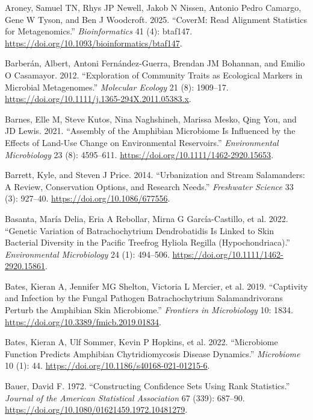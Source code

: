 \documentclass[
  12pt,
]{article}
\newlength{\cslhangindent}
\newenvironment{CSLReferences}[2] %
 {\begin{list}{}{%
  \setlength{\itemindent}{0pt}
  \setlength{\leftmargin}{0pt}
  \setlength{\parsep}{0pt}
  \ifodd #1
   \setlength{\leftmargin}{\cslhangindent}
   \setlength{\itemindent}{-1\cslhangindent}
  \fi
  \setlength{\itemsep}{#2\baselineskip}}}
 {\end{list}}
\begin{document}
\begin{CSLReferences}{1}{1}
Aroney, Samuel TN, Rhys JP Newell, Jakob N Nissen, Antonio Pedro
Camargo, Gene W Tyson, and Ben J Woodcroft. 2025. {``{CoverM}: {Read}
Alignment Statistics for Metagenomics.''} \emph{Bioinformatics} 41 (4):
btaf147. \url{https://doi.org/10.1093/bioinformatics/btaf147}.

Barberán, Albert, Antoni Fernández-Guerra, Brendan JM Bohannan, and
Emilio O Casamayor. 2012. {``Exploration of Community Traits as
Ecological Markers in Microbial Metagenomes.''} \emph{Molecular Ecology}
21 (8): 1909--17.
\url{https://doi.org/10.1111/j.1365-294X.2011.05383.x}.

Barnes, Elle M, Steve Kutos, Nina Naghshineh, Marissa Mesko, Qing You,
and JD Lewis. 2021. {``Assembly of the Amphibian Microbiome Is
Influenced by the Effects of Land-Use Change on Environmental
Reservoirs.''} \emph{Environmental Microbiology} 23 (8): 4595--611.
\url{https://doi.org/10.1111/1462-2920.15653}.

Barrett, Kyle, and Steven J Price. 2014. {``Urbanization and Stream
Salamanders: A Review, Conservation Options, and Research Needs.''}
\emph{Freshwater Science} 33 (3): 927--40.
\url{https://doi.org/10.1086/677556}.

Basanta, María Delia, Eria A Rebollar, Mirna G García-Castillo, et al.
2022. {``Genetic Variation of {Batrachochytrium} Dendrobatidis Is Linked
to Skin Bacterial Diversity in the {Pacific} Treefrog {Hyliola} Regilla
(Hypochondriaca).''} \emph{Environmental Microbiology} 24 (1): 494--506.
\url{https://doi.org/10.1111/1462-2920.15861}.

Bates, Kieran A, Jennifer MG Shelton, Victoria L Mercier, et al. 2019.
{``Captivity and Infection by the Fungal Pathogen {Batrachochytrium}
Salamandrivorans Perturb the Amphibian Skin Microbiome.''}
\emph{Frontiers in Microbiology} 10: 1834.
\url{https://doi.org/10.3389/fmicb.2019.01834}.

{Bates, Kieran A, Ulf Sommer, Kevin P Hopkins, et al.} 2022.
{``Microbiome Function Predicts Amphibian Chytridiomycosis Disease
Dynamics.''} \emph{Microbiome} 10 (1): 44.
\url{https://doi.org/10.1186/s40168-021-01215-6}.

Bauer, David F. 1972. {``Constructing Confidence Sets Using Rank
Statistics.''} \emph{Journal of the American Statistical Association} 67
(339): 687--90. \url{https://doi.org/10.1080/01621459.1972.10481279}.


\end{CSLReferences}
\end{document}

